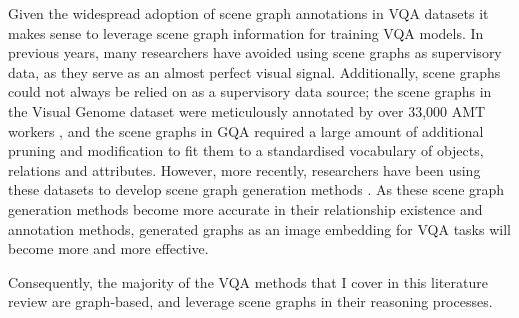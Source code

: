 Given the widespread adoption of scene graph annotations in VQA datasets \cite{krishna2017visual, zhu2016visual7w, johnson2017clevr, hudson2019gqa} it makes sense to leverage scene graph information for training VQA models. In previous years, many researchers have avoided using scene graphs as supervisory data, as they serve as an almost perfect visual signal. Additionally, scene graphs could not always be relied on as a supervisory data source; the scene graphs in the Visual Genome dataset were meticulously annotated by over 33,000 AMT workers \cite{krishna2017visual}, and the scene graphs in GQA required a large amount of additional pruning and modification to fit them to a standardised vocabulary of objects, relations and attributes. However, more recently, researchers have been using these datasets to develop scene graph generation methods \cite{xu2017scene, li2017scene, yang2018graph, tang2019learning}. As these scene graph generation methods become more accurate in their relationship existence and annotation methods, generated graphs as an image embedding for VQA tasks will become more and more effective.

Consequently, the majority of the VQA methods that I cover in this literature review are graph-based, and leverage scene graphs in their reasoning processes.







